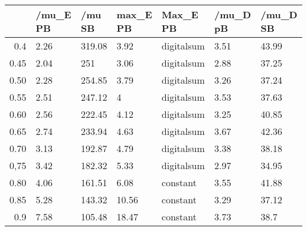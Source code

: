\begin{table}[ht]
\centering
\begin{tabular}{rllllll}
  \hline
 & /mu\_E PB & /mu SB & max\_E PB & Max\_E PB & /mu\_D pB & /mu\_D SB \\ 
  \hline
0.4 & 2.26 & 319.08 & 3.92 & digitalsum & 3.51 & 43.99 \\ 
  0.45 & 2.04 & 251 & 3.06 & digitalsum & 2.88 & 37.25 \\ 
  0.50 & 2.28 & 254.85 & 3.79 & digitalsum & 3.26 & 37.24 \\ 
  0.55 & 2.51 & 247.12 & 4 & digitalsum & 3.53 & 37.63 \\ 
  0.60 & 2.56 & 222.45 & 4.12 & digitalsum & 3.25 & 40.85 \\ 
  0.65 & 2.74 & 233.94 & 4.63 & digitalsum & 3.67 & 42.36 \\ 
  0.70 & 3.13 & 192.87 & 4.79 & digitalsum & 3.38 & 38.18 \\ 
  0,75 & 3.42 & 182.32 & 5.33 & digitalsum & 2.97 & 34.95 \\ 
  0.80 & 4.06 & 161.51 & 6.08 & constant & 3.55 & 41.88 \\ 
  0.85 & 5.28 & 143.32 & 10.56 & constant & 3.29 & 37.12 \\ 
  0.9 & 7.58 & 105.48 & 18.47 & constant & 3.73 & 38.7 \\ 
   \hline
\end{tabular}
\end{table}
